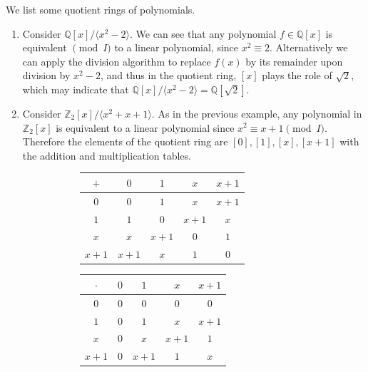   \begin{example}
    \label{ex:quotient-rings-of-polynomials}
    We list some quotient rings of polynomials. 
    \begin{enumerate}
      \item Consider $\mathbb{Q}[x] / \langle x^2 - 2 \rangle$. We can see that any polynomial $f \in \mathbb{Q}[x]$ is equivalent $\pmod{I}$ to a linear polynomial, since $x^2 \equiv 2$. Alternatively we can apply the division algorithm to replace $f(x)$ by its remainder upon division by $x^2 - 2$, and thus in the quotient ring, $[x]$ plays the role of $\sqrt{2}$, which may indicate that $\mathbb{Q}[x] / \langle x^2 - 2 \rangle = \mathbb{Q}[\sqrt{2}]$. 
      \item Consider $\mathbb{Z}_2 [x]/ \langle x^2 + x + 1 \rangle$. As in the previous example, any polynomial in $\mathbb{Z}_2[x]$ is equivalent to a linear polynomial since $x^2 \equiv x + 1 \pmod{I}$. Therefore the elements of the quotient ring are $[0], [1], [x], [x+1]$ with the addition and multiplication tables. 

      \begin{figure}[H]
        \centering
        \begin{subfigure}[b]{0.48\textwidth}
          \centering
          \begin{tabular}{c|cccc}
            $+$ & $0$ & $1$ & $x$ & $x + 1$ \\
            \hline
            $0$ & $0$ & $1$ & $x$ & $x + 1$ \\
            $1$ & $1$ & $0$ & $x + 1$ & $x$ \\
            $x$ & $x$ & $x + 1$ & $0$ & $1$ \\
            $x + 1$ & $x + 1$ & $x$ & $1$ & $0$ \\
          \end{tabular}
          \caption{}
        \end{subfigure}
        \hfill 
        \begin{subfigure}[b]{0.48\textwidth}
          \centering
          \begin{tabular}{c|cccc}
            $\cdot$ & $0$ & $1$ & $x$ & $x + 1$ \\
            \hline
            $0$ & $0$ & $0$ & $0$ & $0$ \\
            $1$ & $0$ & $1$ & $x$ & $x + 1$ \\
            $x$ & $0$ & $x$ & $x + 1$ & $1$ \\
            $x + 1$ & $0$ & $x + 1$ & $1$ & $x$ \\
          \end{tabular}
          \caption{}
        \end{subfigure}
        \label{fig:boolean-algebra-tables}
      \end{figure}
    \end{enumerate}
  \end{example}

